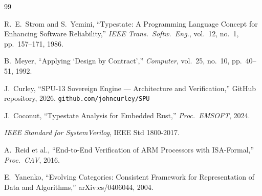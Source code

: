 \documentclass[conference]{IEEEtran}
\begin{document}
\begin{thebibliography}{99}

R.~E.~Strom and S.~Yemini,
``Typestate: A Programming Language Concept for Enhancing Software
Reliability,''
\textit{IEEE Trans.\ Softw.\ Eng.}, vol.~12, no.~1, pp.~157--171, 1986.

B.~Meyer,
``Applying `Design by Contract',''
\textit{Computer}, vol.~25, no.~10, pp.~40--51, 1992.

J.~Curley,
``SPU-13 Sovereign Engine --- Architecture and Verification,''
GitHub repository, 2026.  \texttt{github.com/johncurley/SPU}

J.~Coconut,
``Typestate Analysis for Embedded Rust,''
\textit{Proc.\ EMSOFT}, 2024.

\textit{IEEE Standard for SystemVerilog}, IEEE Std 1800-2017.

A.~Reid et al.,
``End-to-End Verification of ARM Processors with ISA-Formal,''
\textit{Proc.\ CAV}, 2016.

E.~Yanenko,
``Evolving Categories: Consistent Framework for Representation of Data and
Algorithms,''
arXiv:cs/0406044, 2004.

\end{thebibliography}
\end{document}
